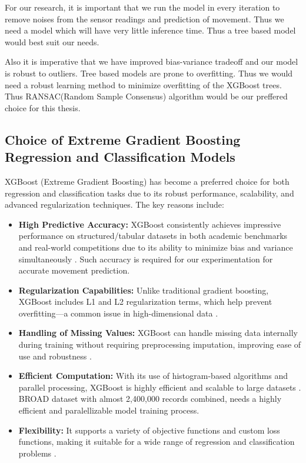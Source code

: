 \documentclass{iutbscthesis}
\begin{document}
For our research, it is important that we run the model in every iteration to remove noises from the sensor readings and prediction of movement. Thus we need a model which will have very little inference time. Thus a tree based model would best suit our needs.

\par
Also it is imperative that we have improved bias-variance tradeoff and our model is robust to outliers. Tree based models are prone to overfitting\cite{overfitTrees}. Thus we would need a robust learning method to minimize overfitting of the XGBoost trees. Thus RANSAC(Random Sample Consensus)\cite{fischler1981random}  algorithm would be our preffered choice for this thesis.

\subsection{Choice of Extreme Gradient Boosting Regression and Classification Models}
XGBoost (Extreme Gradient Boosting) has become a preferred choice for both regression and classification tasks due to its robust performance, scalability, and advanced regularization techniques. The key reasons include:

\begin{itemize}
    \item \textbf{High Predictive Accuracy:} XGBoost consistently achieves impressive performance on structured/tabular datasets in both academic benchmarks and real-world competitions due to its ability to minimize bias and variance simultaneously \cite{chen2016xgboost}. Such accuracy is required for our experimentation for accurate movement prediction.
    
    \item \textbf{Regularization Capabilities:} Unlike traditional gradient boosting, XGBoost includes L1 and L2 regularization terms, which help prevent overfitting—a common issue in high-dimensional data \cite{chen2016xgboost}.
    
    \item \textbf{Handling of Missing Values:} XGBoost can handle missing data internally during training without requiring preprocessing imputation, improving ease of use and robustness \cite{chen2016xgboost}.
    
    \item \textbf{Efficient Computation:} With its use of histogram-based algorithms and parallel processing, XGBoost is highly efficient and scalable to large datasets \cite{ke2017lightgbm}. BROAD dataset with almost 2,400,000 records combined, needs a highly efficient and paralellizable model training process.
    
    \item \textbf{Flexibility:} It supports a variety of objective functions and custom loss functions, making it suitable for a wide range of regression and classification problems \cite{chen2016xgboost}.
\end{itemize}
\end{document}

